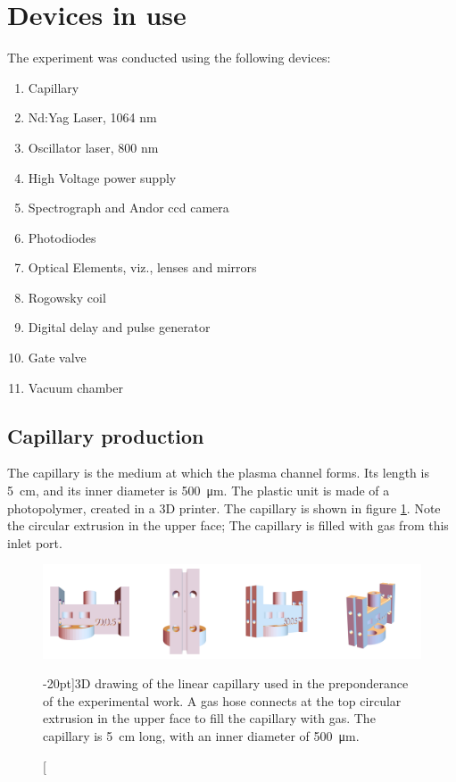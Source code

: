 \documentclass[justified,nofonts,nobib,openany]{tufte-book}
\begin{document}
	\section{Devices in use}\label{sec:devices}
The experiment was conducted using the following devices:
\begin{enumerate}
    \item Capillary
    \item Nd:Yag Laser, 1064 nm
    \item Oscillator laser, 800 nm
    \item High Voltage power supply
    \item Spectrograph and Andor ccd camera
    \item Photodiodes
    \item Optical Elements, viz., lenses and mirrors
    \item Rogowsky coil
    \item Digital delay and pulse generator
    \item Gate valve
    \item Vacuum chamber
\end{enumerate}
\subsection{Capillary production}
The capillary is the medium at which the plasma channel forms. Its length is \SI{5}{\cm}, and its inner diameter is \SI{500}{\um}. The plastic unit is made of a photopolymer, created in a 3D printer. The capillary is shown in figure \ref{fig:capillaryCAD}. Note the circular extrusion in the upper face; The capillary is filled with gas from this inlet port.
\begin{figure}
    \centering
    \includegraphics[width=\textwidth]{figures/capillary_cad.png}
    \caption[][-20pt]{3D drawing of the linear capillary used in the preponderance of the experimental work. A gas hose connects at the top circular extrusion in the upper face to fill the capillary with gas. The capillary is \SI{5}{\cm} long, with an inner diameter of \SI{500}{\um}.}
    \label{fig:capillaryCAD}
\end{figure}
\end{document}
